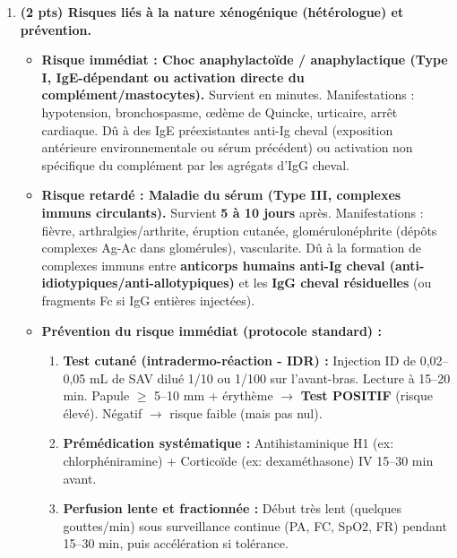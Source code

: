 \documentclass[11pt]{article}
\begin{document}
\begin{corrige}
\begin{enumerate}
\begin{itemize}
        \item \textbf{Voie intraveineuse (IV) privilégiée :} \textbf{Urgent vital} (risque de paralysie respiratoire, hémorragie, choc). La voie IV assure une \textbf{biodisponibilité de 100\% immédiate} (concentration plasmatique thérapeutique instantanée). La voie intramusculaire (IM) est \textbf{proscrite en urgence} : absorption lente, imprévisible (vasoconstriction du choc), douloureuse, volume limité, risque de nécrose locale ; elle retarde l'action neutralisante critique.
    \end{itemize}
    \item \textbf{(2 pts) Risques liés à la nature xénogénique (hétérologue) et prévention.}
    \begin{itemize}
        \item \textbf{Risque immédiat : \textbf{Choc anaphylactoïde / anaphylactique} (Type I, IgE-dépendant ou activation directe du complément/mastocytes).} Survient en minutes. Manifestations : hypotension, bronchospasme, œdème de Quincke, urticaire, arrêt cardiaque. Dû à des IgE préexistantes anti-Ig cheval (exposition antérieure environnementale ou sérum précédent) ou activation non spécifique du complément par les agrégats d'IgG cheval.
        \item \textbf{Risque retardé : \textbf{Maladie du sérum} (Type III, complexes immuns circulants).} Survient \textbf{5 à 10 jours} après. Manifestations : fièvre, arthralgies/arthrite, éruption cutanée, glomérulonéphrite (dépôts complexes Ag-Ac dans glomérules), vascularite. Dû à la formation de complexes immuns entre \textbf{anticorps humains anti-Ig cheval (anti-idiotypiques/anti-allotypiques)} et les \textbf{IgG cheval résiduelles} (ou fragments Fc si IgG entières injectées).
        \item \textbf{Prévention du risque immédiat (protocole standard) :}
        \begin{enumerate}
            \item \textbf{Test cutané (intradermo-réaction - IDR) :} Injection ID de 0,02--0,05 mL de SAV dilué 1/10 ou 1/100 sur l'avant-bras. Lecture à 15--20 min. Papule $\ge$ 5--10 mm + érythème $\rightarrow$ \textbf{Test POSITIF} (risque élevé). Négatif $\rightarrow$ risque faible (mais pas nul).
            \item \textbf{Prémédication systématique :} Antihistaminique H1 (ex: chlorphéniramine) + Corticoïde (ex: dexaméthasone) IV 15--30 min avant.
            \item \textbf{Perfusion lente et fractionnée :} Début très lent (quelques gouttes/min) sous surveillance continue (PA, FC, SpO2, FR) pendant 15--30 min, puis accélération si tolérance.

\end{enumerate}
\end{itemize}
\end{enumerate}
\end{corrige}
\end{document}
